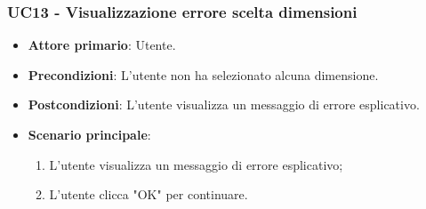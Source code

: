 \subsubsection{UC13 - Visualizzazione errore scelta dimensioni}
\begin{itemize}
	\item \textbf{Attore primario}: Utente.
	\item \textbf{Precondizioni}: L'utente non ha selezionato alcuna dimensione.
	\item \textbf{Postcondizioni}: L'utente visualizza un messaggio di errore esplicativo.
	\item \textbf{Scenario principale}:
		\begin{enumerate}
			\item L'utente visualizza un messaggio di errore esplicativo;
			\item L'utente clicca "OK" per continuare.
		\end{enumerate}
\end{itemize}